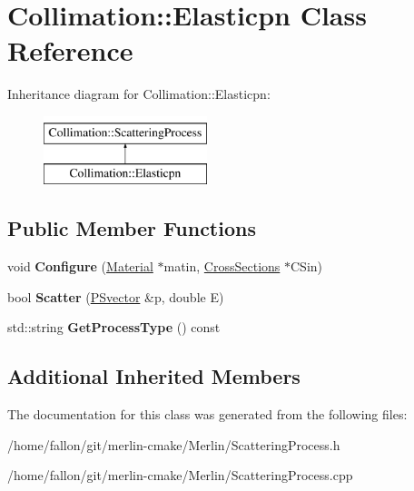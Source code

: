 \hypertarget{classCollimation_1_1Elasticpn}{}\section{Collimation\+:\+:Elasticpn Class Reference}
\label{classCollimation_1_1Elasticpn}
Inheritance diagram for Collimation\+:\+:Elasticpn\+:\begin{figure}[H]
\begin{center}
\leavevmode
\includegraphics[height=2.000000cm]{classCollimation_1_1Elasticpn}
\end{center}
\end{figure}
\subsection*{Public Member Functions}
\begin{DoxyCompactItemize}
\item 
\mbox{\label{classCollimation_1_1Elasticpn_a4936dc72ce59bf97e08d7b3d08a04f4e}} 
void {\bfseries Configure} (\hyperlink{classMaterial}{Material} $\ast$matin, \hyperlink{classCollimation_1_1CrossSections}{Cross\+Sections} $\ast$C\+Sin)
\item 
\mbox{\label{classCollimation_1_1Elasticpn_aad8b618c7a11d3deebae1d367e094d0a}} 
bool {\bfseries Scatter} (\hyperlink{classPSvector}{P\+Svector} \&p, double E)
\item 
\mbox{\label{classCollimation_1_1Elasticpn_ad2113716a36e2f4b35763044726122ec}} 
std\+::string {\bfseries Get\+Process\+Type} () const
\end{DoxyCompactItemize}
\subsection*{Additional Inherited Members}


The documentation for this class was generated from the following files\+:\begin{DoxyCompactItemize}
\item 
/home/fallon/git/merlin-\/cmake/\+Merlin/Scattering\+Process.\+h\item 
/home/fallon/git/merlin-\/cmake/\+Merlin/Scattering\+Process.\+cpp\end{DoxyCompactItemize}
